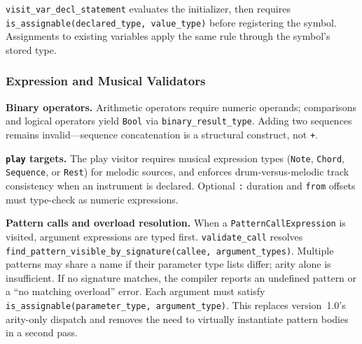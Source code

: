 \texttt{visit\_var\_decl\_statement} evaluates the initializer, then requires \texttt{is\_assignable(declared\_type,
value\_type)} before registering the symbol.
Assignments to existing variables apply the same rule through the symbol's stored type.

\subsubsection{Expression and Musical Validators}

\noindent \textbf{Binary operators.} Arithmetic operators require numeric operands; comparisons and logical operators
yield \texttt{Bool} via \texttt{binary\_result\_type}.
Adding two sequences remains invalid---sequence concatenation is a structural construct, not \texttt{+}.

\noindent \textbf{\texttt{play} targets.} The play visitor requires musical expression types (\texttt{Note},
\texttt{Chord}, \texttt{Sequence}, or \texttt{Rest}) for melodic sources, and enforces drum-versus-melodic track
consistency when an instrument is declared.
Optional \texttt{:} duration and \texttt{from} offsets must type-check as numeric expressions.

\noindent \textbf{Pattern calls and overload resolution.} When a \texttt{PatternCallExpression} is visited, argument
expressions are typed first.
\texttt{validate\_call} resolves \texttt{find\_pattern\_visible\_by\_signature(callee, argument\_types)}.
Multiple patterns may share a name if their parameter type lists differ; arity alone is insufficient.
If no signature matches, the compiler reports an undefined pattern or a ``no matching overload'' error.
Each argument must satisfy \texttt{is\_assignable(parameter\_type, argument\_type)}.
This replaces version~1.0's arity-only dispatch and removes the need to virtually instantiate pattern bodies in a
second pass.
